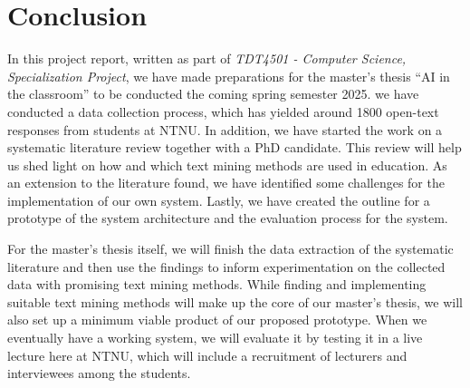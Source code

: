 \chapter{Conclusion}\label{chap:conclusion}


In this project report, written as part of \textit{TDT4501 - Computer Science, Specialization Project}, we have made preparations for the master's thesis ``AI in the classroom'' to be conducted the coming spring semester 2025. we have conducted a data collection process, which has yielded around 1800 open-text responses from students at NTNU. In addition, we have started the work on a systematic literature review together with a PhD candidate. This review will help us shed light on how and which text mining methods are used in education. As an extension to the literature found, we have identified some challenges for the implementation of our own system. Lastly, we have created the outline for a prototype of the system architecture and the evaluation process for the system.

For the master's thesis itself, we will finish the data extraction of the systematic literature and then use the findings to inform experimentation on the collected data with promising text mining methods. While finding and implementing suitable text mining methods will make up the core of our master's thesis, we will also set up a minimum viable product of our proposed prototype. When we eventually have a working system, we will evaluate it by testing it in a live lecture here at NTNU, which will include a recruitment of lecturers and interviewees among the students.

\begin{comment}
The conclusion chapter is usually quite short – a paragraph or two – mainly summarising what was achieved in the project. It should answer the \emph{claim} part of the introduction. It should also say something about what comes next (`future work').
\end{comment}
